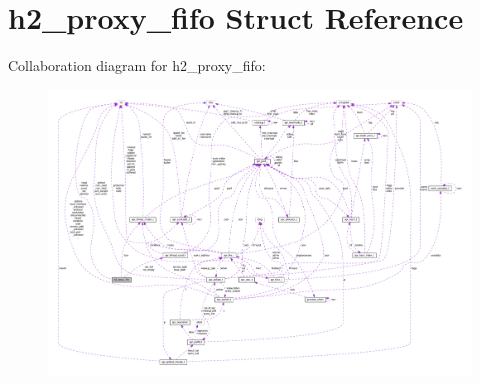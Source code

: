 \hypertarget{structh2__proxy__fifo}{}\section{h2\+\_\+proxy\+\_\+fifo Struct Reference}
\label{structh2__proxy__fifo}


Collaboration diagram for h2\+\_\+proxy\+\_\+fifo\+:
\nopagebreak
\begin{figure}[H]
\begin{center}
\leavevmode
\includegraphics[width=350pt]{structh2__proxy__fifo__coll__graph}
\end{center}
\end{figure}
